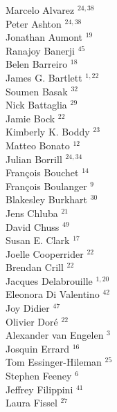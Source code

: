 \documentclass[PICOReport.tex]{subfiles}
\begin{document}
\footnotesize {

\begin{multicols}{4}
Marcelo Alvarez $^{24,38}$                 \\
Peter Ashton $^{24,38}$                    \\
Jonathan Aumont $^{19}$                 \\
Ranajoy Banerji $^{45}$                 \\
Belen Barreiro $^{18}$                  \\
James G. Bartlett $^{1,22}$               \\
Soumen Basak $^{32}$                    \\
Nick Battaglia $^{29}$                  \\
Jamie Bock $^{22}$                      \\
Kimberly K. Boddy $^{23}$               \\
Matteo Bonato $^{12}$                   \\
Julian Borrill $^{24,34}$                  \\
Fran\c{c}ois Bouchet $^{14}$            \\
Fran\c{c}ois Boulanger $^{9}$          \\
Blakesley Burkhart $^{30}$              \\
Jens Chluba $^{21}$                     \\
David Chuss $^{49}$                     \\
Susan E. Clark $^{17}$                  \\
Joelle Cooperrider $^{22}$              \\
Brendan Crill $^{22}$                   \\
Jacques Delabrouille $^{1,20}$            \\
Eleonora Di Valentino $^{42}$           \\
Joy Didier $^{47}$                      \\
Olivier Dor\'e $^{22}$                  \\
Alexander van Engelen $^{3}$           \\
Josquin Errard $^{16}$                  \\
Tom Essinger-Hileman $^{25}$            \\
Stephen Feeney $^{6}$                  \\
Jeffrey Filippini $^{41}$               \\
Laura Fissel $^{27}$                    \\

\end{multicols}}
\end{document}
